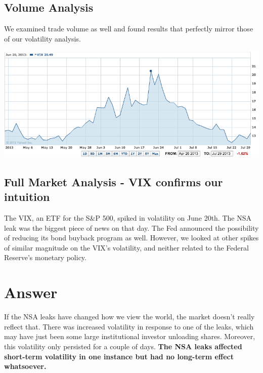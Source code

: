 \documentclass[10pt]{amsart}
\begin{document}
\subsection{Volume Analysis}
We examined trade volume as well and found results that perfectly mirror those of our volatility analysis. \\

\centerline{\includegraphics[scale=0.5]{vix_june_20.png}}

\subsection{Full Market Analysis - VIX confirms our intuition}
The VIX, an ETF for the S\&P 500, spiked in volatility on June 20th. The NSA leak was the biggest piece of news on that day. The Fed announced the possibility of reducing its bond buyback program as well. However, we looked at other spikes of similar magnitude on the VIX's volatility, and neither related to the Federal Reserve's monetary policy.

\section{Answer}
If the NSA leaks have changed how we view the world, the market doesn't really reflect that. There was increased volatility in response to one of the leaks, which may have just been some large institutional investor unloading shares. Moreover, this volatility only persisted for a couple of days. \textbf{The NSA leaks affected short-term volatility in one instance but had no long-term effect whatsoever.}
\end{document}
